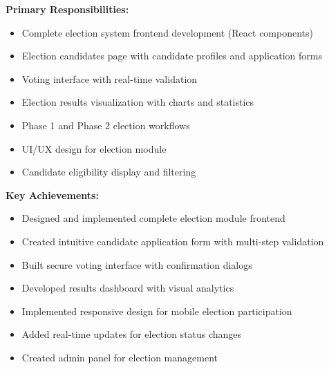\documentclass[12pt,a4paper]{article}
\begin{document}
\vspace{10pt}

\begin{tcolorbox}[colback=LightBlue, colframe=DarkTeal, title=\textbf{Tawyabul Islam Tamim (Roll: 04) — Election System Specialist}, fonttitle=\bfseries\large]

\textbf{Primary Responsibilities:}
\begin{itemize}[noitemsep]
  \item Complete election system frontend development (React components)
  \item Election candidates page with candidate profiles and application forms
  \item Voting interface with real-time validation
  \item Election results visualization with charts and statistics
  \item Phase 1 and Phase 2 election workflows
  \item UI/UX design for election module
  \item Candidate eligibility display and filtering
\end{itemize}

\textbf{Key Achievements:}
\begin{itemize}[noitemsep]
  \item Designed and implemented complete election module frontend
  \item Created intuitive candidate application form with multi-step validation
  \item Built secure voting interface with confirmation dialogs
  \item Developed results dashboard with visual analytics
  \item Implemented responsive design for mobile election participation
  \item Added real-time updates for election status changes
  \item Created admin panel for election management
\end{itemize}
\end{tcolorbox}

\vspace{10pt}
\end{document}
